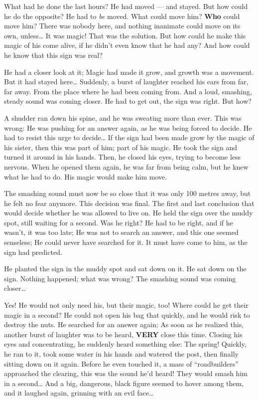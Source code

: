 What had he done the last hours? He had moved --- and stayed. But how could he do the opposite? 
He had to \emph{be} moved. What could move him? \textbf{Who} could move him? There was nobody here, and nothing inanimate could move on its own, unless\dots
It was magic! That was the solution. But how could he make this magic of his come alive, if he didn't even know that he had any?
And how could he know that this sign was real?

He had a closer look at it; Magic had made it grow, and growth was a movement. But it had stayed here\dots
Suddenly, a burst of laughter reached his ears from far, far away. 
From the place where he had been coming from. 
And a loud, smashing, steady sound was coming closer. He had to get out, the sign was right. But how?

A shudder ran down his spine, and he was sweating more than ever. This was wrong: He was pushing for an answer again, as he was being forced to decide. He had to resist this urge to decide\dots
If the sign had been made grow by the magic of his sister, then this was part of him; part of his magic.
He took the sign and turned it around in his hands. Then, he closed his eyes, trying to become less nervous. When he opened them again, he was far from being calm, but he knew what he had to do. 
His magic would make him move.

The smashing sound must now be so close that it was only 100 metres away, but he felt no fear anymore. This decision was final. 
The first and last conclusion that would decide whether he was allowed to live on. 
He held the sign over the muddy spot, still waiting for a second. Was he right? He had to be right, and if he wasn't, it was too late; He was not to search an answer, and this one seemed senseless; He could never have searched for it. 
It must have come to him, as the sign had predicted.

He planted the sign in the muddy spot and sat down on it. He sat down on the sign. Nothing happened; what was wrong? 
The smashing sound was coming closer\dots

Yes! He would not only need his, but their magic, too!
Where could he get their magic in a second? He could not open his bag that quickly, and he would risk to destroy the nuts. He searched for an answer again; As soon as he realized this, another burst of laughter was to be heard, \textbf{VERY} close this time. 
Closing his eyes and concentrating, he suddenly heard something else: The spring! Quickly, he ran to it, took some water in his hands and watered the post, then finally sitting down on it again. 
Before he even touched it, a mass of \enquote{roadbuilders} approached the clearing, this was the sound he'd heard! They would smash him in a second\dots
And a big, dangerous, black figure seemed to hover among them, and it laughed again, grinning with an evil face\dots
